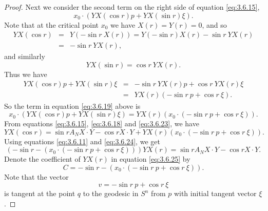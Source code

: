 \documentclass[12pt]{article}
\begin{document}
\begin{proof}
Next we consider the second term on the right side of equation \eqref{eq:3.6.15},
\begin{equation}
\label{eq:3.6.19}
x_0 \cdot (YX(\cos r) p + YX(\sin r) \xi).
\end{equation}
Note that at the critical point $x_0$ we have $X(r) = Y(r) = 0$, and so
\begin{eqnarray}
\label{eq:3.6.20}
YX(\cos r) &=& Y( - \sin r \ X(r)) = Y(- \sin r) X(r) - \sin r \ YX(r)\\ \nonumber 
&=& - \sin r \ YX(r),
\end{eqnarray}
and similarly
\begin{equation}
\label{eq:3.6.21}
YX(\sin r) = \cos r \ YX(r).
\end{equation}
Thus we have
\begin{eqnarray}
\label{eq:3.6.22}
YX (\cos r) p + YX(\sin r) \xi &=& - \sin r \ YX(r) p + \cos r \ YX(r) \xi \\
 &=& YX(r) ( -\sin r\  p + \cos r\  \xi). \nonumber 
\end{eqnarray}
So the term in equation \eqref{eq:3.6.19} above is
\begin{equation}
\label{eq:3.6.23}
x_0 \cdot (YX(\cos r) p + YX(\sin r) \xi) = YX(r) (x_0 \cdot ( -\sin r\  p + \cos r\  \xi)).
\end{equation}
From equations \eqref{eq:3.6.15}, \eqref{eq:3.6.18} and \eqref{eq:3.6.23}, we have
\begin{equation}
\label{eq:3.6.24}
YX(\cos r) = \sin r A_N X \cdot Y - \cos r X \cdot Y + YX(r) (x_0 \cdot ( -\sin r\  p + \cos r\  \xi)).
\end{equation}
Using equations \eqref{eq:3.6.11} and \eqref{eq:3.6.24}, we get
\begin{equation}
\label{eq:3.6.25}
(- \sin r - (x_0 \cdot ( -\sin r\  p + \cos r\  \xi))) YX(r) = \sin r A_N X \cdot Y - \cos r X \cdot Y.
\end{equation}
Denote the coefficient of $YX(r)$ in equation \eqref{eq:3.6.25} by 
\begin{equation}
\label{eq:3.6.26}
C = - \sin r - (x_0 \cdot ( -\sin r\  p + \cos r\  \xi)).
\end{equation}
Note that the vector 
\begin{equation}
\label{eq:3.6.27}
v =  -\sin r\  p + \cos r\  \xi
\end{equation}
is tangent at the point $q$ to the geodesic in $S^n$ from $p$ with initial tangent vector $\xi$.




\end{proof}
\end{document}
